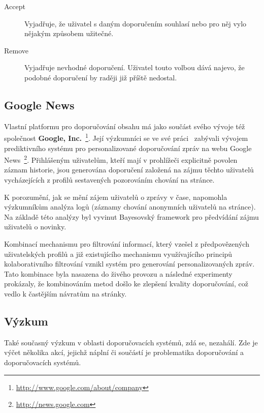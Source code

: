 \documentclass[thesis=M,czech]{FITthesis}[2014/05/07]
\begin{document}
\begin{description}
	\item[Accept] Vyjadřuje, že uživatel s daným doporučením souhlasí nebo pro něj vylo nějakým způsobem užitečné.
	\item[Remove] Vyjadřuje nevhodné doporučení. Uživatel touto volbou dává najevo, že podobné doporučení by raději již příště nedostal.
\end{description}

\subsection{Google News}	

Vlastní platformu pro doporučování obsahu má jako součást svého vývoje též společnost \textbf{Google, Inc.}~\footnote{\url{http://www.google.com/about/company}}. Její výzkumníci se ve své práci~\cite{googlenews} zabývali vývojem prediktivního systému pro personalizované doporučování zpráv na webu Google News~\footnote{\url{http://news.google.com}}. Přihlášeným uživatelům, kteří mají v prohlížeči explicitně povolen záznam historie, jsou generována doporučení založená na zájmu těchto uživatelů vycházejících z profilů sestavených pozorováním chování na stránce.  

K porozumění, jak se mění zájem uživatelů o zprávy v čase, napomohla výzkumníkům analýza logů (záznamy chování anonymních uživatelů na stránce). Na základě této analýzy byl vyvinut Bayesovský framework pro předvídání zájmu uživatelů o novinky.

Kombinací mechanismu pro filtrování informací, který vzešel z předpovězených uživatelských profilů a již existujícího mechanismu využívajícího principů kolaborativního filtrování vznikl systém pro generování personalizovaných zpráv. Tato kombinace byla nasazena do živého provozu a následné experimenty prokázaly, že kombinováním metod došlo ke zlepšení kvality doporučování, což vedlo k častějším návratům na stránky.

\subsection{Výzkum}

Také současný výzkum v oblasti doporučovacích systémů, zdá se, nezahálí. Zde je výčet několika akcí, jejichž náplní či součástí je problematika doporučování a doporučovacích systémů.
\end{document}
